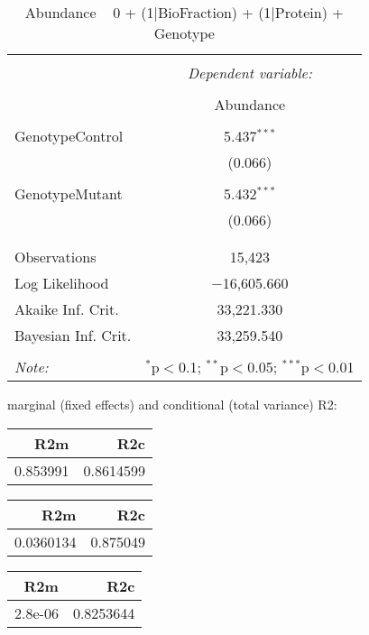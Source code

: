 \documentclass[11pt]{report}
\begin{document}
\begin{table}[!htbp] \centering 
  \caption{Abundance ~ 0 + (1|BioFraction) + (1|Protein) + Genotype} 
  \label{} 
\begin{tabular}{@{\extracolsep{5pt}}lc} 
\\[-1.8ex]\hline 
\hline \\[-1.8ex] 
 & \multicolumn{1}{c}{\textit{Dependent variable:}} \\ 
\cline{2-2} 
\\[-1.8ex] & Abundance \\ 
\hline \\[-1.8ex] 
 GenotypeControl & 5.437$^{***}$ \\ 
  & (0.066) \\ 
  & \\ 
 GenotypeMutant & 5.432$^{***}$ \\ 
  & (0.066) \\ 
  & \\ 
\hline \\[-1.8ex] 
Observations & 15,423 \\ 
Log Likelihood & $-$16,605.660 \\ 
Akaike Inf. Crit. & 33,221.330 \\ 
Bayesian Inf. Crit. & 33,259.540 \\ 
\hline 
\hline \\[-1.8ex] 
\textit{Note:}  & \multicolumn{1}{r}{$^{*}$p$<$0.1; $^{**}$p$<$0.05; $^{***}$p$<$0.01} \\ 
\end{tabular} 
\end{table} 
marginal (fixed effects) and conditional (total variance) R2:

\begin{tabular}{r|r}
\hline
R2m & R2c\\
\hline
0.853991 & 0.8614599\\
\hline
\end{tabular}

\begin{tabular}{r|r}
\hline
R2m & R2c\\
\hline
0.0360134 & 0.875049\\
\hline
\end{tabular}

\begin{tabular}{r|r}
\hline
R2m & R2c\\
\hline
2.8e-06 & 0.8253644\\
\hline
\end{tabular}
\end{document}
